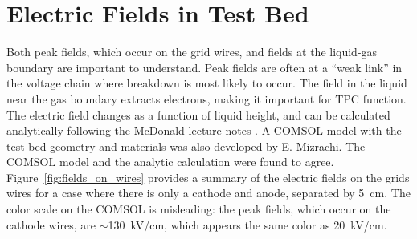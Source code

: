 \FloatBarrier
\section{Electric Fields in Test Bed}
Both peak fields, which occur on the grid wires, and fields at the liquid-gas boundary are important to understand. Peak fields are often at a ``weak link'' in the voltage chain where breakdown is most likely to occur. The field in the liquid near the gas boundary extracts electrons, making it important for \ac{TPC} function. The electric field changes as a function of liquid height, and can be calculated analytically following the McDonald lecture notes \cite{McDonald2003}. A COMSOL model with the test bed geometry and materials was also developed by E. Mizrachi. The COMSOL model and the analytic calculation were found to agree. Figure~\ref{fig:fields_on_wires} provides a summary of the electric fields on the grids wires for a case where there is only a cathode and anode, separated by 5~cm. The color scale on the COMSOL is misleading: the peak fields, which occur on the cathode wires, are $\sim$130~kV/cm, which appears the same color as 20~kV/cm.

